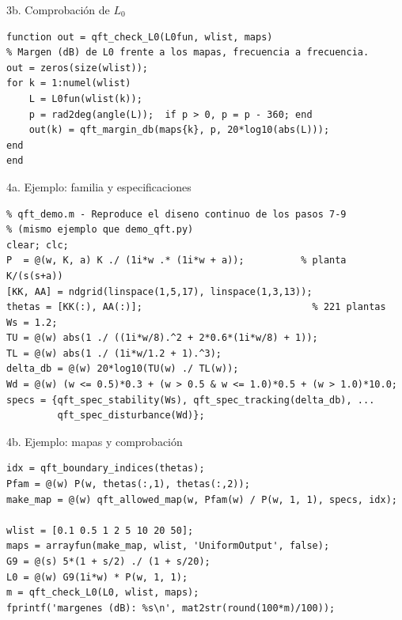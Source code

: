 \documentclass[aspectratio=169,11pt]{beamer}
\begin{document}
\begin{frame}[fragile]{3b. Comprobación de $L_0$}
\footnotesize
\begin{verbatim}
function out = qft_check_L0(L0fun, wlist, maps)
% Margen (dB) de L0 frente a los mapas, frecuencia a frecuencia.
out = zeros(size(wlist));
for k = 1:numel(wlist)
    L = L0fun(wlist(k));
    p = rad2deg(angle(L));  if p > 0, p = p - 360; end
    out(k) = qft_margin_db(maps{k}, p, 20*log10(abs(L)));
end
end
\end{verbatim}
\end{frame}

\begin{frame}[fragile]{4a. Ejemplo: familia y especificaciones}
\scriptsize
\begin{verbatim}
% qft_demo.m - Reproduce el diseno continuo de los pasos 7-9
% (mismo ejemplo que demo_qft.py)
clear; clc;
P  = @(w, K, a) K ./ (1i*w .* (1i*w + a));          % planta K/(s(s+a))
[KK, AA] = ndgrid(linspace(1,5,17), linspace(1,3,13));
thetas = [KK(:), AA(:)];                              % 221 plantas
Ws = 1.2;
TU = @(w) abs(1 ./ ((1i*w/8).^2 + 2*0.6*(1i*w/8) + 1));
TL = @(w) abs(1 ./ (1i*w/1.2 + 1).^3);
delta_db = @(w) 20*log10(TU(w) ./ TL(w));
Wd = @(w) (w <= 0.5)*0.3 + (w > 0.5 & w <= 1.0)*0.5 + (w > 1.0)*10.0;
specs = {qft_spec_stability(Ws), qft_spec_tracking(delta_db), ...
         qft_spec_disturbance(Wd)};
\end{verbatim}
\end{frame}

\begin{frame}[fragile]{4b. Ejemplo: mapas y comprobación}
\scriptsize
\begin{verbatim}
idx = qft_boundary_indices(thetas);
Pfam = @(w) P(w, thetas(:,1), thetas(:,2));
make_map = @(w) qft_allowed_map(w, Pfam(w) / P(w, 1, 1), specs, idx);

wlist = [0.1 0.5 1 2 5 10 20 50];
maps = arrayfun(make_map, wlist, 'UniformOutput', false);
G9 = @(s) 5*(1 + s/2) ./ (1 + s/20);
L0 = @(w) G9(1i*w) * P(w, 1, 1);
m = qft_check_L0(L0, wlist, maps);
fprintf('margenes (dB): %s\n', mat2str(round(100*m)/100));
\end{verbatim}
\end{frame}
\end{document}
